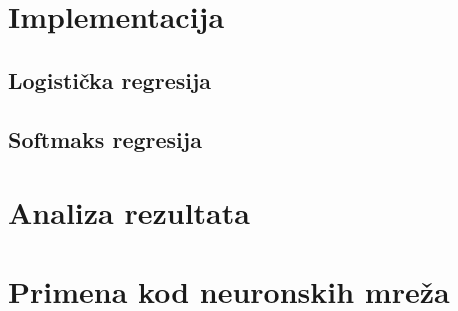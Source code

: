 \documentclass[a4paper,12pt]{report}
\begin{document}
\chapter{Implementacija}

\section{Logistička regresija}

\section{Softmaks regresija}

\chapter{Analiza rezultata}

\chapter{Primena kod neuronskih mreža}
\end{document}
